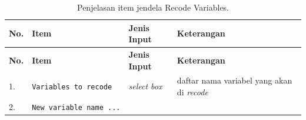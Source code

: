 \documentclass[12pt,]{krantz}
\begin{document}
\begin{longtable}[]{@{}llll@{}}
\caption{\label{tab:recodevar2} Penjelasan item jendela Recode Variables.}\tabularnewline
\toprule
\begin{minipage}[b]{0.07\columnwidth}\raggedright
\textbf{No.}\strut
\end{minipage} & \begin{minipage}[b]{0.25\columnwidth}\raggedright
\textbf{Item}\strut
\end{minipage} & \begin{minipage}[b]{0.15\columnwidth}\raggedright
\textbf{Jenis Input}\strut
\end{minipage} & \begin{minipage}[b]{0.42\columnwidth}\raggedright
\textbf{Keterangan}\strut
\end{minipage}\tabularnewline
\midrule
\endfirsthead
\toprule
\begin{minipage}[b]{0.07\columnwidth}\raggedright
\textbf{No.}\strut
\end{minipage} & \begin{minipage}[b]{0.25\columnwidth}\raggedright
\textbf{Item}\strut
\end{minipage} & \begin{minipage}[b]{0.15\columnwidth}\raggedright
\textbf{Jenis Input}\strut
\end{minipage} & \begin{minipage}[b]{0.42\columnwidth}\raggedright
\textbf{Keterangan}\strut
\end{minipage}\tabularnewline
\midrule
\endhead
\begin{minipage}[t]{0.07\columnwidth}\raggedright
1.\strut
\end{minipage} & \begin{minipage}[t]{0.25\columnwidth}\raggedright
\texttt{Variables\ to\ recode}\strut
\end{minipage} & \begin{minipage}[t]{0.15\columnwidth}\raggedright
\emph{select box}\strut
\end{minipage} & \begin{minipage}[t]{0.42\columnwidth}\raggedright
daftar nama variabel yang akan di \emph{recode}\strut
\end{minipage}\tabularnewline
\begin{minipage}[t]{0.07\columnwidth}\raggedright
2.\strut
\end{minipage} & \begin{minipage}[t]{0.25\columnwidth}\raggedright
\texttt{New\ variable\ name\ ...}\strut

\end{minipage}
\end{longtable}
\end{document}
